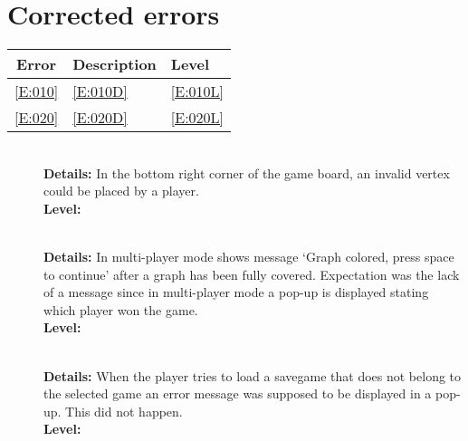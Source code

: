 \section{Corrected errors}
\label{section:corrected-errors}

\begin{tabular}{cll}

\hline
	\textbf{Error} & \textbf{Description} & \textbf{Level} \\
	\hline
	\ref{E:010} & \ref{E:010D} & \ref{E:010L} \\
	\ref{E:020} & \ref{E:020D} & \ref{E:020L} \\
	\hline
\end{tabular}

\begin{description}
	\item[] \textbf{} \\
	\textbf{Details:} In the bottom right corner of the \twixt game board, an invalid vertex could be placed by a player. \\
	\textbf{Level:} 

	\item[] \textbf{} \\
	\textbf{Details:} In multi-player mode \graphcoloring shows message `Graph colored, press space to continue' after a graph has been fully covered. Expectation was the lack of a message since in multi-player mode a pop-up is displayed stating which player won the game. \\
	\textbf{Level:} 
	
	\item[] \textbf{} \\
	\textbf{Details:} When the player tries to load a savegame that does not belong to the selected game an error message 
						was supposed to be displayed in a pop-up. This did not happen. \\
	\textbf{Level:} 
\end{description}
